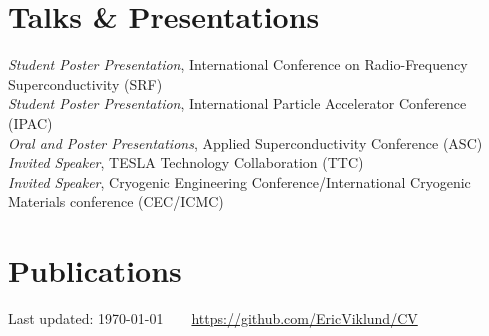 \documentclass[11pt]{article} %
\begin{document}
\section*{Talks \& Presentations}

\emph{Student Poster Presentation}, International Conference on Radio-Frequency Superconductivity (SRF)\\
\emph{Student Poster Presentation}, International Particle Accelerator Conference (IPAC)\\
\emph{Oral and Poster Presentations}, Applied Superconductivity Conference (ASC)\\
\emph{Invited Speaker}, TESLA Technology Collaboration (TTC)\\
\emph{Invited Speaker}, Cryogenic Engineering Conference/International Cryogenic Materials conference (CEC/ICMC)

\section*{Publications}

\nocite{*}
\printbibliography[heading=none]




\begin{center}
	\scriptsize
	Last updated: \today~~\raisebox{-0.5pt}{\textbullet}~~\href{https://github.com/EricViklund/CV}{https://github.com/EricViklund/CV}
\end{center}

\end{document}
